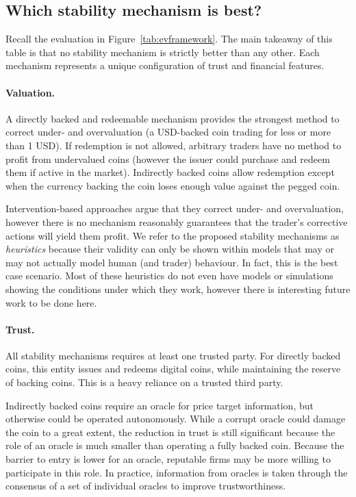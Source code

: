 \subsection{Which stability mechanism is best?}
\label{app:target}

Recall the evaluation in Figure~\ref{tab:evframework}. The main takeaway of this table is that no stability mechanism is strictly better than any other. Each mechanism represents a unique configuration of trust and financial features.

\paragraph{Valuation.} A directly backed and redeemable mechanism provides the strongest method to correct under- and overvaluation (\eg a USD-backed coin trading for less or more than 1 USD). If redemption is not allowed, arbitrary traders have no method to profit from undervalued coins (however the  issuer could purchase and redeem them if active in the market). Indirectly backed coins allow redemption except when the currency backing the coin loses enough value against the pegged coin.

Intervention-based approaches argue that they correct under- and overvaluation, however there is no mechanism reasonably guarantees that the trader's corrective actions will yield them profit. We refer to the proposed stability mechanisms as \textit{heuristics} because their validity can only be shown within models that may or may not actually model human (and trader) behaviour. In fact, this is the best case scenario. Most of these heuristics do not even have models or simulations showing the conditions under which they work, however there is interesting future work to be done here. 

\paragraph{Trust.} All stability mechanisms requires at least one trusted party. For directly backed coins, this entity issues and redeems digital coins, while maintaining the reserve of backing coins. This is a heavy reliance on a trusted third party.

Indirectly backed coins require an oracle for price target information, but otherwise could be operated autonomously. While a corrupt oracle could damage the coin to a great extent, the reduction in trust is still significant because the role of an oracle is much smaller than operating a fully backed coin. Because the barrier to entry is lower for an oracle, reputable firms may be more willing to participate in this role. In practice, information from oracles is taken through the consensus of a set of individual oracles to improve trustworthiness.


